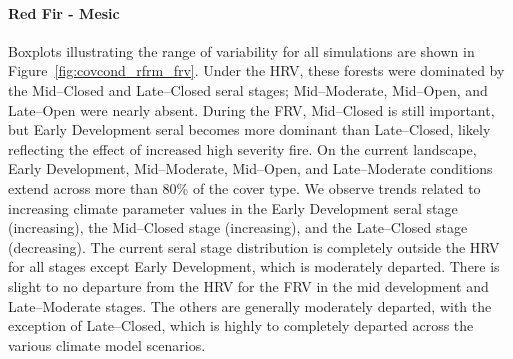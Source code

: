 \paragraph*{Red Fir - Mesic} 
Boxplots illustrating the range of variability for all simulations are shown in Figure~\ref{fig:covcond_rfrm_frv}. Under the HRV, these forests were dominated by the Mid--Closed and Late--Closed seral stages; Mid--Moderate, Mid--Open, and Late--Open were nearly absent. During the FRV, Mid--Closed is still important, but Early Development seral becomes more dominant than Late--Closed, likely reflecting the effect of increased high severity fire. On the current landscape, Early Development, Mid--Moderate, Mid--Open, and Late--Moderate conditions extend across more than 80\% of the cover type. We observe trends related to increasing climate parameter values in the Early Development seral stage (increasing), the Mid--Closed stage (increasing), and the Late--Closed stage (decreasing). The current seral stage distribution is completely outside the HRV for all stages except Early Development, which is moderately departed. There is slight to no departure from the HRV for the FRV in the mid development and Late--Moderate stages. The others are generally moderately departed, with the exception of Late--Closed, which is highly to completely departed across the various climate model scenarios.


